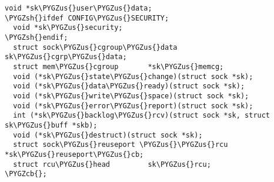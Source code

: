 \documentclass[a4paper,8pt,english]{sphinxmanual}
\def\PYGZus{\char`\_}
\def\PYGZcb{\char`\}}
\def\PYGZsh{\char`\#}
\begin{document}
\begin{Verbatim}[commandchars=\\\{\}]
  void *sk\PYGZus{}user\PYGZus{}data;
\PYGZsh{}ifdef CONFIG\PYGZus{}SECURITY;
  void *sk\PYGZus{}security;
\PYGZsh{}endif;
  struct sock\PYGZus{}cgroup\PYGZus{}data sk\PYGZus{}cgrp\PYGZus{}data;
  struct mem\PYGZus{}cgroup       *sk\PYGZus{}memcg;
  void (*sk\PYGZus{}state\PYGZus{}change)(struct sock *sk);
  void (*sk\PYGZus{}data\PYGZus{}ready)(struct sock *sk);
  void (*sk\PYGZus{}write\PYGZus{}space)(struct sock *sk);
  void (*sk\PYGZus{}error\PYGZus{}report)(struct sock *sk);
  int (*sk\PYGZus{}backlog\PYGZus{}rcv)(struct sock *sk, struct sk\PYGZus{}buff *skb);
  void (*sk\PYGZus{}destruct)(struct sock *sk);
  struct sock\PYGZus{}reuseport \PYGZus{}\PYGZus{}rcu     *sk\PYGZus{}reuseport\PYGZus{}cb;
  struct rcu\PYGZus{}head         sk\PYGZus{}rcu;
\PYGZcb{};
\end{Verbatim}
\end{document}
